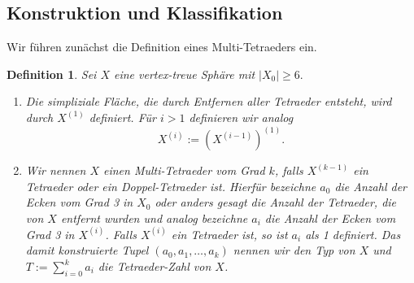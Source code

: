 \documentclass[12pt,titlepage,twoside,cleardoublepage]{article}
\theoremstyle{nummermitklammern}
\newtheorem{definition}[temp]{Definition}
\newtheorem{definition}[zahl]{Definition}
\numberwithin{equation}{section}
\begin{document}
\subsection{Konstruktion und Klassifikation}\label{cactus}
Wir führen zunächst die Definition eines Multi-Tetraeders ein.
\begin{definition}\label{defcac}
Sei $X$ eine vertex-treue Sphäre mit $\vert X_0\vert \geq 6.$
\begin{enumerate}
\item Die simpliziale Fläche, die durch Entfernen aller Tetraeder entsteht, wird durch $X^{(1)}$ definiert. Für $i>1$ definieren wir analog 
\[
X^{(i)}:=(X^{(i-1)})^{(1)}.
\]
\item Wir nennen $X$ einen Multi-Tetraeder vom \emph{Grad} $k$, falls $X^{(k-1)}$ ein Tetraeder oder ein Doppel-Tetraeder ist. Hierfür bezeichne $a_0$ die Anzahl der Ecken vom Grad 3 in $X_0$ oder anders gesagt die Anzahl der Tetraeder, die von $X$ entfernt wurden und analog bezeichne $a_i$ die Anzahl der Ecken vom Grad 3 in $X^{(i)}$. Falls $X^{(i)}$ ein Tetraeder ist, so ist $a_i$ als 1 definiert. Das damit konstruierte Tupel $(a_0,a_1,\ldots,a_k)$ nennen wir den \emph{Typ} von $X$ und $T:=\sum_{i=0}^{k} a_i$ die \emph{Tetraeder-Zahl} von $X$.\\
\end{enumerate}
\end{definition}
\end{document}
